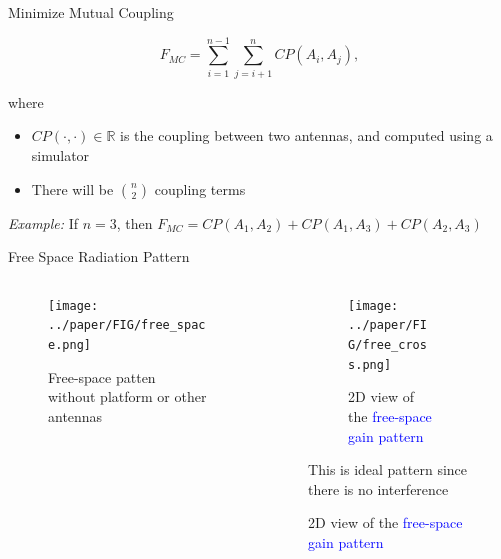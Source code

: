 \documentclass{beamer}
\begin{document}
\begin{frame}{Minimize Mutual Coupling}
    \begin{tcolorbox}[colback=green!5]
        \begin{equation}
            F_{MC} = \sum_{i=1}^{n-1}\sum_{j=i+1}^{n} CP(A_i, A_j),
        \end{equation}
    \end{tcolorbox}
    where
    \begin{itemize}
        \item $CP(\cdot, \cdot) \in \mathbb R$ is the coupling between two antennas, and computed using a simulator
        \item There will be $n \choose 2$ coupling terms 
    \end{itemize}
    \vspace{2mm}
    \small\textit{Example:} If $n=3$, then $F_{MC} = CP(A_1, A_2) + CP(A_1, A_3) + CP(A_2, A_3)$
\end{frame}

\begin{frame}{Free Space Radiation Pattern}
    \begin{columns}
        \begin{column}{0.5\linewidth}
            \begin{figure}
                \vspace{-2.5cm}
                \centering
                \texttt{[image: ../paper/FIG/free\_space.png]}
                \caption*{\tiny Free-space patten without platform or other antennas}
            \end{figure}
        \end{column}
        \begin{column}{0.5\linewidth}
            \begin{overlayarea}{\textwidth}{\textheight}
            \begin{figure}
                \begin{subfigure}{\columnwidth}
                \centering
                \texttt{[image: ../paper/FIG/free\_cross.png]}
                \caption*{\tiny 2D view of the \textcolor{blue}{free-space gain pattern}}%
            \end{subfigure}\vspace*{2mm}
    \begin{tcolorbox}[colback=green!5]
        \centering
        This is ideal pattern since there is no interference
    \end{tcolorbox}
            \end{figure}
    \end{overlayarea}
        \end{column}
    \end{columns}
\end{frame}
\end{document}
